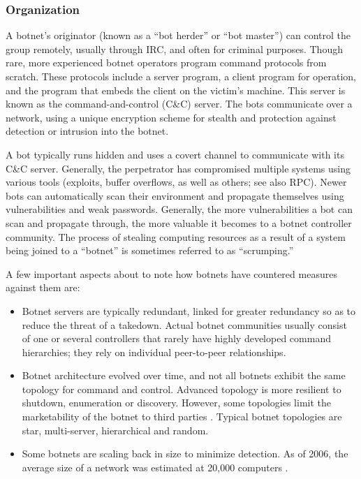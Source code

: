 \documentclass[]{article}
\begin{document}
\subsubsection{Organization}

A botnet’s originator (known as a “bot herder” or “bot master”) can control the group remotely, usually through IRC, and often for criminal purposes. Though rare, more experienced botnet operators program command protocols from scratch. These protocols include a server program, a client program for operation, and the program that embeds the client on the victim’s machine. This server is known as the command-and-control (C\&C) server. The bots communicate over a network, using a unique encryption scheme for stealth and protection against detection or intrusion into the botnet.

A bot typically runs hidden and uses a covert channel to communicate with its C\&C server. Generally, the perpetrator has compromised multiple systems using various tools (exploits, buffer overflows, as well as others; see also RPC). Newer bots can automatically scan their environment and propagate themselves using vulnerabilities and weak passwords. Generally, the more vulnerabilities a bot can scan and propagate through, the more valuable it becomes to a botnet controller community. The process of stealing computing resources as a result of a system being joined to a “botnet” is sometimes referred to as “scrumping.”

A few important aspects about to note how botnets have countered measures against them are:

\begin{itemize}
	\item Botnet servers are typically redundant, linked for greater redundancy so as to reduce the threat of a takedown. Actual botnet communities usually consist of one or several controllers that rarely have highly developed command hierarchies; they rely on individual peer-to-peer relationships\cite{article:botcomun}.

	\item Botnet architecture evolved over time, and not all botnets exhibit the same topology for command and control. Advanced topology is more resilient to shutdown, enumeration or discovery. However, some topologies limit the marketability of the botnet to third parties \cite{article:hackbot}. Typical botnet topologies are star, multi-server, hierarchical and random.

	\item Some botnets are scaling back in size to minimize detection. As of 2006, the average size of a network was estimated at 20,000 computers \cite{website:bottrojan}.


\end{itemize}
\end{document}
